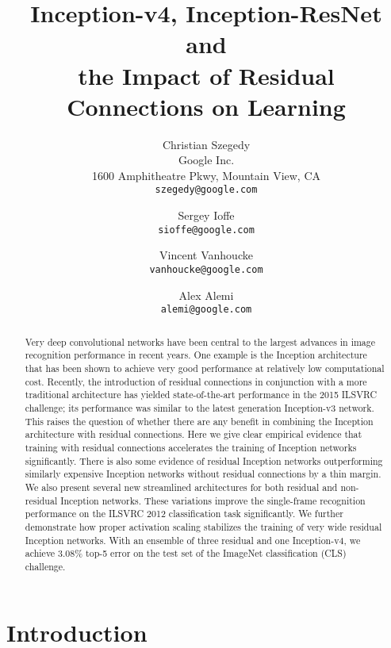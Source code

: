 \documentclass[10pt,twocolumn,letterpaper]{article}
\begin{document}
\title{Inception-v4, Inception-ResNet and\\the Impact of Residual Connections on Learning}

\author{Christian Szegedy\\
Google Inc.\\
1600 Amphitheatre Pkwy, Mountain View, CA\\
{\tt\small szegedy@google.com}
\and
Sergey Ioffe\\
{\tt\small sioffe@google.com}
\and
Vincent Vanhoucke\\
{\tt\small vanhoucke@google.com}
\and
Alex Alemi\\
{\tt\small alemi@google.com}
}

\maketitle

\begin{abstract}
Very deep convolutional networks have been central to the largest advances in image
recognition performance in recent years. One example is the Inception
architecture that has been shown to achieve very good performance at relatively
low computational cost. Recently, the introduction of residual connections
in conjunction with a more traditional architecture has yielded state-of-the-art
performance in the 2015 ILSVRC challenge; its performance was similar
to the latest generation Inception-v3 network. This raises the question of whether
there are any benefit in combining the Inception architecture with residual
connections.
Here we give clear empirical evidence that training with residual connections
accelerates the training of Inception networks significantly. There is also
some evidence of residual Inception networks outperforming similarly
expensive Inception networks without residual connections by a thin margin.
We also present several new streamlined architectures for both residual and
non-residual Inception networks. These variations improve the single-frame
recognition performance on the ILSVRC 2012 classification task significantly.
We further demonstrate how proper activation scaling stabilizes the training of
very wide residual Inception networks. With an ensemble of three residual and
one Inception-v4, we achieve 3.08\% top-5 error on the test set of
the ImageNet classification (CLS) challenge.

\end{abstract}

\section{Introduction}
\end{document}
